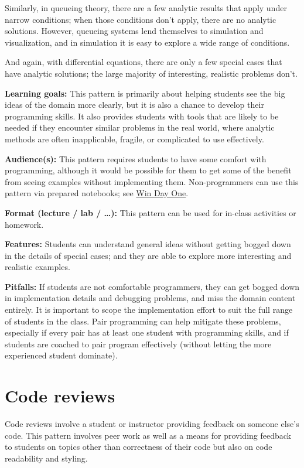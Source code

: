 \documentclass[]{book}
\begin{document}
Similarly, in queueing theory, there are a few analytic results that
apply under narrow conditions; when those conditions don't apply, there
are no analytic solutions. However, queueing systems lend themselves to
simulation and visualization, and in simulation it is easy to explore a
wide range of conditions.

And again, with differential equations, there are only a few special
cases that have analytic solutions; the large majority of interesting,
realistic problems don't.

\textbf{Learning goals:} This pattern is primarily about helping
students see the big ideas of the domain more clearly, but it is also a
chance to develop their programming skills. It also provides students
with tools that are likely to be needed if they encounter similar
problems in the real world, where analytic methods are often
inapplicable, fragile, or complicated to use effectively.

\textbf{Audience(s):} This pattern requires students to have some
comfort with programming, although it would be possible for them to get
some of the benefit from seeing examples without implementing them.
Non-programmers can use this pattern via prepared notebooks; see
\protect\hyperlink{win-day-one}{Win Day One}.

\textbf{Format (lecture / lab / \ldots{}):} This pattern can be used for
in-class activities or homework.

\textbf{Features:} Students can understand general ideas without getting
bogged down in the details of special cases; and they are able to
explore more interesting and realistic examples.

\textbf{Pitfalls:} If students are not comfortable programmers, they can
get bogged down in implementation details and debugging problems, and
miss the domain content entirely. It is important to scope the
implementation effort to suit the full range of students in the class.
Pair programming can help mitigate these problems, especially if every
pair has at least one student with programming skills, and if students
are coached to pair program effectively (without letting the more
experienced student dominate).

\section{Code reviews}\label{code-reviews}

Code reviews involve a student or instructor providing feedback on
someone else's code. This pattern involves peer work as well as a means
for providing feedback to students on topics other than correctness of
their code but also on code readability and styling.
\end{document}
